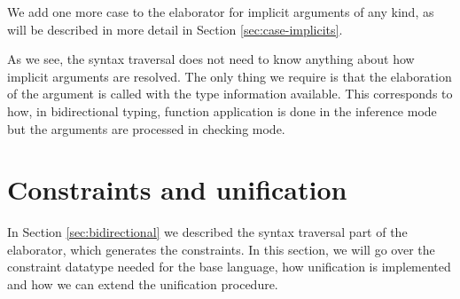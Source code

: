 We add one more case to the elaborator for implicit arguments of any
kind, as will be described in more detail in Section
\ref{sec:case-implicits}.

\begin{imageonly}
\begin{Shaded}
\begin{Highlighting}[]
\OtherTok{=} 
\OtherTok{\textless{}{-}}
\OperatorTok{$} 
\end{Highlighting}
\end{Shaded}
\end{imageonly}

As we see, the syntax traversal does not need to know anything about how
implicit arguments are resolved. The only thing we require is that the
elaboration of the argument is called with the type information
available. This corresponds to how, in bidirectional typing, function
application is done in the inference mode but the arguments are
processed in checking mode.

\begin{imageonly}
\begin{Shaded}
\begin{Highlighting}[]
\OtherTok{=} 
\OtherTok{\textless{}{-}}
\OtherTok{\textless{}{-}}
  \NormalTok{ (}
\end{Highlighting}
\end{Shaded}
\end{imageonly}
\hypertarget{sec:constraints_and_unification}{%
\section{Constraints and
unification}\label{sec:constraints_and_unification}}

In Section \ref{sec:bidirectional} we described the syntax traversal
part of the elaborator, which generates the constraints. In this
section, we will go over the constraint datatype needed for the base
language, how unification is implemented and how we can extend the
unification procedure.

